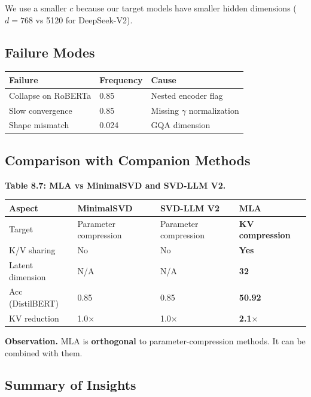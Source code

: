 We use a smaller $c$ because our target models have smaller hidden 
dimensions ($d = 768$ vs 5120 for DeepSeek-V2).

\subsection{Failure Modes}

\begin{table}[H]
\centering
\small
\begin{tabular}{lll}
\toprule
\textbf{Failure} & \textbf{Frequency} & \textbf{Cause} \\
\midrule
Collapse on RoBERTa & 0.85 & Nested encoder flag \\
Slow convergence & 0.85 & Missing $\gamma$ normalization \\
Shape mismatch & 0.024 & GQA dimension \\
\bottomrule
\end{tabular}
\end{table}

\subsection{Comparison with Companion Methods}

\textbf{Table 8.7: MLA vs MinimalSVD and SVD-LLM V2.}

\begin{table}[H]
\centering
\small
\begin{tabular}{llll}
\toprule
\textbf{Aspect} & \textbf{MinimalSVD} & \textbf{SVD-LLM V2} & \textbf{MLA} \\
\midrule
Target & Parameter compression & Parameter compression & \textbf{KV compression} \\
K/V sharing & No & No & \textbf{Yes} \\
Latent dimension & N/A & N/A & \textbf{32} \\
Acc (DistilBERT) & 0.85 & 0.85 & \textbf{50.92} \\
KV reduction & 1.0$\times$ & 1.0$\times$ & \textbf{2.1$\times$} \\
\bottomrule
\end{tabular}
\end{table}

\textbf{Observation.} MLA is \textbf{orthogonal} to parameter-compression methods. It 
can be combined with them.

\subsection{Summary of Insights}

